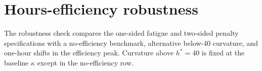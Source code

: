 \documentclass[12pt,a4paper]{article}
\begin{document}
\clearpage
\section{Hours-efficiency robustness}\label{app:hours_efficiency}

The robustness check compares the one-sided fatigue and two-sided penalty specifications with a no-efficiency benchmark, alternative below-40 curvature, and one-hour shifts in the efficiency peak. Curvature above $h^*=40$ is fixed at the baseline $\kappa$ except in the no-efficiency row.



\clearpage


\end{document}
